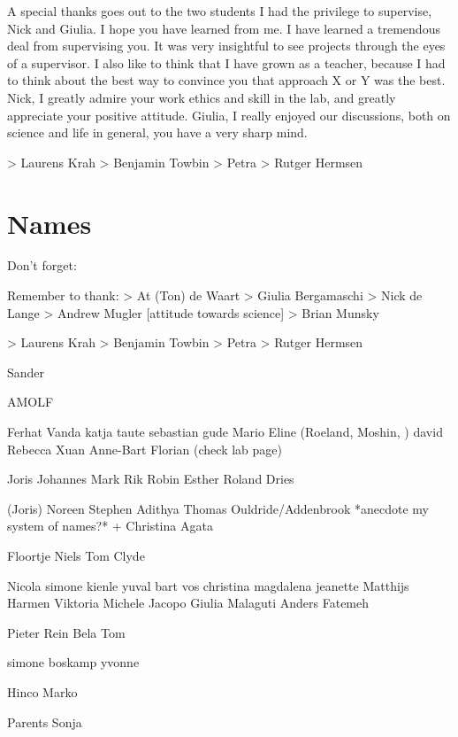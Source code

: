 
A special thanks goes out to the two students I had the privilege to supervise, Nick and Giulia.
%
I hope you have learned from me.
I have learned a tremendous deal from supervising you.
%
It was very insightful to see projects through the eyes of a supervisor. 
I also like to think that I have grown as a teacher, 
because I had to think about the best way to convince you that 
approach X or Y was the best.
%
Nick, I greatly admire your work ethics and skill in the lab, 
and greatly appreciate your positive attitude.
%
Giulia, I really enjoyed our discussions,
both on science and life in general,
you have a very sharp mind.



> Laurens Krah
> Benjamin Towbin
> Petra
> Rutger Hermsen










\section*{Names}

Don't forget:



Remember to thank:
> At (Ton) de Waart
> Giulia Bergamaschi
> Nick de Lange
> Andrew Mugler [attitude towards science]
> Brian Munsky


> Laurens Krah
> Benjamin Towbin
> Petra
> Rutger Hermsen

Sander

AMOLF

Ferhat
Vanda
katja taute
sebastian gude
Mario
Eline
(Roeland, Moshin, )
david 
Rebecca
Xuan 
Anne-Bart
Florian
(check lab page)

Joris
Johannes
Mark
Rik
Robin
Esther
Roland Dries

(Joris)
Noreen
Stephen
Adithya
Thomas Ouldride/Addenbrook *anecdote my system of names?* + Christina
Agata

Floortje
Niels
Tom
Clyde

Nicola
simone kienle
yuval
bart vos
christina
magdalena
jeanette
Matthijs
Harmen
Viktoria
Michele
Jacopo
Giulia Malaguti
Anders
Fatemeh



Pieter Rein
Bela
Tom



simone boskamp
yvonne


Hinco
Marko


Parents
Sonja

















